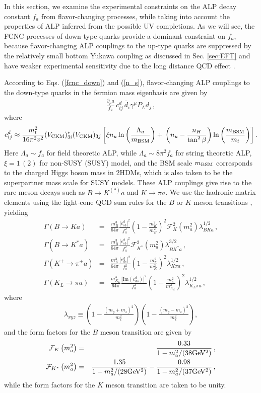 \documentclass[preprint,prd,aps,tighten,nofootinbib,amssymb]{revtex4}
\newcommand{\bea}{\begin{eqnarray}}
\newcommand{\eea}{\end{eqnarray}}
\newcommand{\dis}[1]{\begin{equation}\begin{split}#1\end{split}\end{equation}}
\def\vpq{f_{a}}
\begin{document}
In this section, we examine the experimental constraints on the ALP decay constant $\vpq$ from flavor-changing processes, while
taking into account the properties of ALP inferred from the possible UV completions.
As we will see, the FCNC processes of down-type quarks  provide a dominant constraint on $\vpq$, 
because flavor-changing ALP couplings to the up-type quarks are suppressed by the relatively small bottom Yukawa coupling  as discussed in Sec. \ref{sec:EFT} and 
have weaker experimental sensitivity due to the long distance QCD effect \cite{Burdman:2001tf}.

According to Eqs. (\ref{fcnc_down}) and (\ref{n_s}),  flavor-changing ALP couplings to the down-type quarks in the fermion mass eigenbasis are given by
\bea
 \frac{\partial_\mu a}{\vpq}\,c^d_{ij}\, \bar{d}_i \gamma^\mu P_L d_j \, ,
\eea
where
\dis{ \label{cd_ij}
c^d_{ij}
\approx  \frac{m_t^2}{16\pi^2 v^2}(V_{\rm CKM})_{3i}^* (V_{\rm CKM})_{3j}
\left[\xi  n_u
 \ln\left(\frac{\Lambda_a}{m_{\rm BSM}}\right) +\, \left(n_u-\frac{n_H}{\tan^2 \beta} \right)\ln\left(\frac{m_{\rm BSM}}{m_t}\right) 
 \right]. 
}
 Here  $\Lambda_a\sim f_a$  for field theoretic ALP, while
$\Lambda_a\sim 8\pi^2 f_a$ for string theoretic ALP, $\xi = 1 \,(2)$ for  non-SUSY (SUSY) model, and the BSM scale $m_{\rm BSM}$ corresponds to  the charged Higgs boson  mass 
in 2HDMs, which is also taken to be the superpartner mass scale for SUSY models. 
These ALP couplings give rise to the rare meson decays such as $B\rightarrow K^{(*)} a$ and $K\rightarrow \pi a$.
We use the hadronic matrix elements using the light-cone QCD sum rules for the $B$ or $K$ meson transitions \cite{Batell:2009jf, Deshpande:2005mb, Marciano:1996wy}, yielding 
\bea
\Gamma\left(B\rightarrow Ka\right) &=&  \frac{m_B^3}{64\pi} \frac{\left| c^d_{sb}\right|^2}{\vpq^2}  \left(1-\frac{m_K^2}{m_B^2}\right)^2 \mathcal{F}_K^2\left(m_a^2\right) \lambda^{1/2}_{BKa}\,, \\
\Gamma\left(B\rightarrow K^{*}a\right) &=&   \frac{m_B^3}{64\pi} \frac{\left| c^d_{sb}\right|^2}{\vpq^2} \mathcal{F}_{K^*}^2\left(m_a^2\right) \lambda^{3/2}_{BK^*a}\,,\\
\Gamma\left(K^+\rightarrow \pi^+ a\right) &=&   \frac{m_K^3}{64\pi} \frac{\left| c^d_{ds}\right|^2}{\vpq^2} \left(1-\frac{m_\pi^2}{m_K^2}\right)^2 \lambda^{1/2}_{K\pi a}\,,\\
\Gamma\left(K_L\rightarrow \pi a\right) &=&   \frac{m_{K_L}^3}{64\pi} \frac{\left|\mathrm{Im}\left(c^d_{ds}\right)\right|^2}{\vpq^2} \left(1-\frac{m_\pi^2}{m_{K_L}^2}\right)^2 \lambda^{1/2}_{K_L\pi a}\,,
\eea
where 
\dis{
\lambda_{xyz} \equiv \left(1-\frac{(m_y+m_z)^2}{m_x^2}\right)\left(1-\frac{(m_y-m_z)^2}{m_x^2}\right),
}
and the form factors for the $B$ meson transition are given by \cite{Ball:2004ye, Ball:2004rg}
\bea
\mathcal{F}_K \left(m_a^2\right) & = & \frac{0.33}{1-m_a^2/(38 {\rm GeV^2})}\,,\\
\mathcal{F}_{K^*} \left(m_a^2\right) & = & \frac{1.35}{1-m_a^2/(28 {\rm GeV^2})} - \frac{0.98}{1-m_a^2/(37 {\rm GeV^2})} \, ,
\eea
while the form factors for the $K$ meson transition are taken to be unity.
\end{document}
